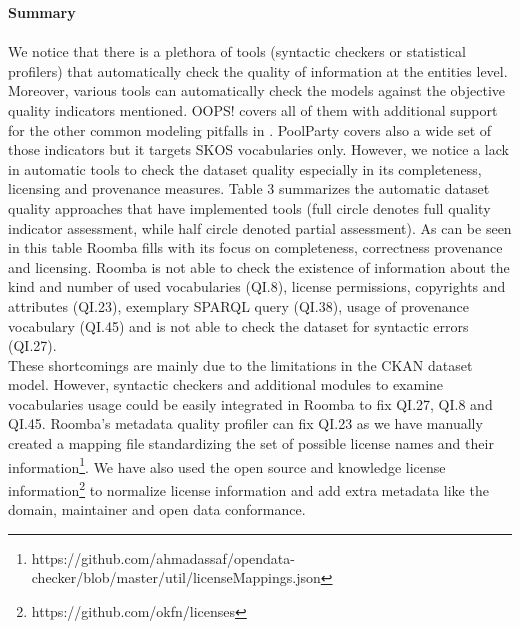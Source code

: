 \documentclass[onecolumn, crcready]{iosart2c}
\begin{document}
\noindent

\textbf{Summary}
\indent \\\\
\indent We notice that there is a plethora of tools (syntactic checkers or statistical profilers) that automatically check the quality of information at the entities level. Moreover, various tools can automatically check the models against the objective quality indicators mentioned. OOPS! covers all of them with additional support for the other common modeling pitfalls in \cite{DBLP:conf/ic3k/KeetSP13}. PoolParty covers also a wide set of those indicators but it targets SKOS vocabularies only. However, we notice a lack in automatic tools to check the dataset quality especially in its completeness, licensing and provenance measures. Table 3 summarizes the automatic dataset quality approaches that have implemented tools (full circle denotes full quality indicator assessment, while half circle denoted partial assessment). As can be seen in this table Roomba fills with its focus on completeness, correctness provenance and licensing. Roomba is not able to check the existence of information about the kind and number of used vocabularies (QI.8), license permissions, copyrights and attributes (QI.23), exemplary SPARQL query (QI.38), usage of provenance vocabulary (QI.45) and is not able to check the dataset for syntactic errors (QI.27).\\These shortcomings are mainly due to the limitations in the CKAN dataset model. However, syntactic checkers and additional modules to examine vocabularies usage could be easily integrated in Roomba to fix QI.27, QI.8 and QI.45. Roomba's metadata quality profiler can fix QI.23 as we have manually created a mapping file standardizing the set of possible license names and their information\footnote{https://github.com/ahmadassaf/opendata-checker/blob/master/util/licenseMappings.json}. We have also used the open source and knowledge license information\footnote{https://github.com/okfn/licenses} to normalize license information and add extra metadata like the domain, maintainer and open data conformance.
\end{document}
